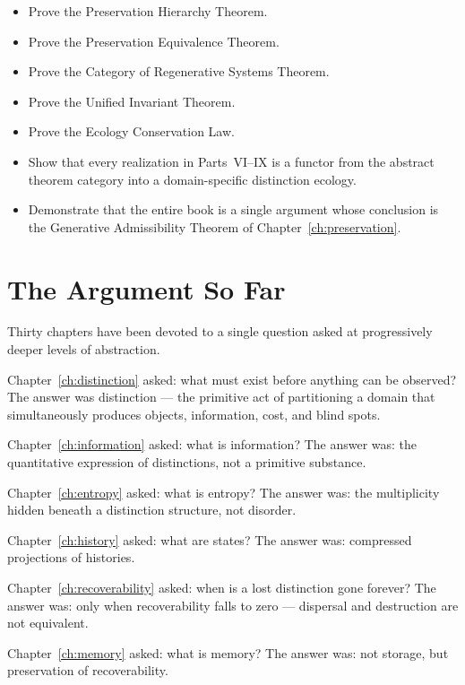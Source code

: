 \documentclass[12pt,twoside,openright]{book}
\newenvironment{objectives}{%
  \begin{tcolorbox}[colback=DistBlue!5,colframe=DistBlue,
    title={\faCheckCircle\enspace Learning Objectives},
    fonttitle=\sffamily\bfseries\color{white},
    attach boxed title to top left={yshift=-2mm,xshift=4mm},
    boxed title style={colback=DistBlue},breakable]
  \begin{itemize}[leftmargin=*,nosep]}{%
  \end{itemize}\end{tcolorbox}\vspace{1em}}
\begin{document}
\begin{objectives}
  \item Prove the Preservation Hierarchy Theorem.
  \item Prove the Preservation Equivalence Theorem.
  \item Prove the Category of Regenerative Systems Theorem.
  \item Prove the Unified Invariant Theorem.
  \item Prove the Ecology Conservation Law.
  \item Show that every realization in Parts~VI--IX is a
        functor from the abstract theorem category into
        a domain-specific distinction ecology.
  \item Demonstrate that the entire book is a single
        argument whose conclusion is the Generative
        Admissibility Theorem of Chapter~\ref{ch:preservation}.
\end{objectives}

\section{The Argument So Far}
\label{sec:ch30-arg}

Thirty chapters have been devoted to a single question
asked at progressively deeper levels of abstraction.

Chapter~\ref{ch:distinction} asked: what must exist before
anything can be observed? The answer was distinction — the
primitive act of partitioning a domain that simultaneously
produces objects, information, cost, and blind spots.

Chapter~\ref{ch:information} asked: what is information?
The answer was: the quantitative expression of distinctions,
not a primitive substance.

Chapter~\ref{ch:entropy} asked: what is entropy? The answer
was: the multiplicity hidden beneath a distinction structure,
not disorder.

Chapter~\ref{ch:history} asked: what are states? The answer
was: compressed projections of histories.

Chapter~\ref{ch:recoverability} asked: when is a lost
distinction gone forever? The answer was: only when
recoverability falls to zero — dispersal and destruction
are not equivalent.

Chapter~\ref{ch:memory} asked: what is memory? The answer
was: not storage, but preservation of recoverability.
\end{document}
